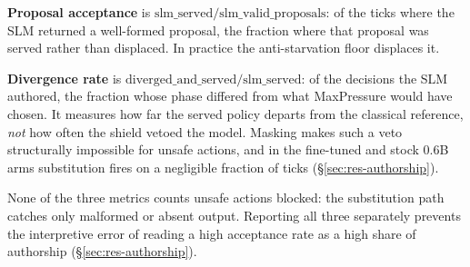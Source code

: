 \textbf{Proposal acceptance} is
$\text{slm\_served}/\text{slm\_valid\_proposals}$: of the ticks where the
SLM returned a well-formed proposal, the fraction where that proposal was
served rather than displaced. In practice the anti-starvation floor
displaces it.

\textbf{Divergence rate} is
$\text{diverged\_and\_served}/\text{slm\_served}$: of the decisions the SLM
authored, the fraction whose phase differed from what MaxPressure would
have chosen. It measures how far the served policy departs from the
classical reference, \emph{not} how often the shield vetoed the model.
Masking makes such a veto structurally impossible for unsafe actions, and
in the fine-tuned and stock 0.6B arms substitution fires on a negligible
fraction of ticks (\S\ref{sec:res-authorship}).

None of the three metrics counts unsafe actions blocked: the substitution
path catches only malformed or absent output. Reporting all three
separately prevents the interpretive
error of reading a high acceptance rate as a high share of authorship
(\S\ref{sec:res-authorship}).

